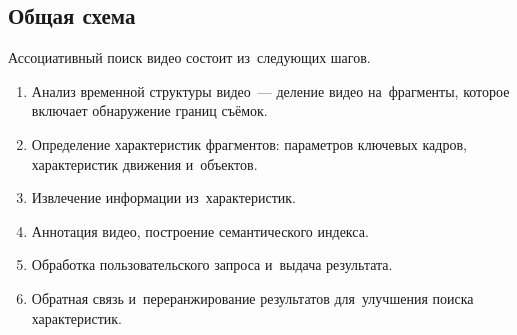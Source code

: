 \subsection{Общая схема}

Ассоциативный поиск видео состоит из~следующих шагов.
\begin{enumerate}
    \item Анализ временной структуры видео~—
        деление видео на~фрагменты, которое включает обнаружение границ съёмок.
    \item Определение характеристик фрагментов:
        параметров ключевых кадров,
        характеристик движения и~объектов.
    \item Извлечение информации из~характеристик.
    \item Аннотация видео, построение семантического индекса.
    \item Обработка пользовательского запроса и~выдача результата.
    \item Обратная связь и~переранжирование результатов для~улучшения поиска характеристик.
\end{enumerate}

